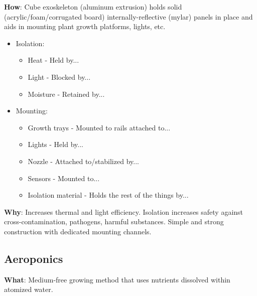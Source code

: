 \documentclass{report}
\begin{document}
\textbf{How}: Cube exoskeleton (aluminum extrusion) holds solid (acrylic/foam/corrugated board) internally-reflective (mylar) panels in place and aids in mounting plant growth platforms, lights, etc.
\begin{itemize}
    \item Isolation:
    \begin{itemize}
        \item Heat - Held by...
        \item Light - Blocked by...
        \item Moisture - Retained by...
    \end{itemize}
    \item Mounting:
    \begin{itemize}
        \item Growth trays - Mounted to rails attached to...
        \item Lights - Held by...
        \item Nozzle - Attached to/stabilized by...
        \item Sensors - Mounted to...
        \item Isolation material - Holds the rest of the things by...
    \end{itemize}
\end{itemize}

\textbf{Why}: Increases thermal and light efficiency. Isolation increases safety against cross-contamination, pathogens, harmful substances. Simple and strong construction with dedicated mounting channels.

\newpage

\subsection{Aeroponics}
\label{sec:aeroponics}

\textbf{What}: Medium-free growing method that uses nutrients dissolved within atomized water.
\end{document}
